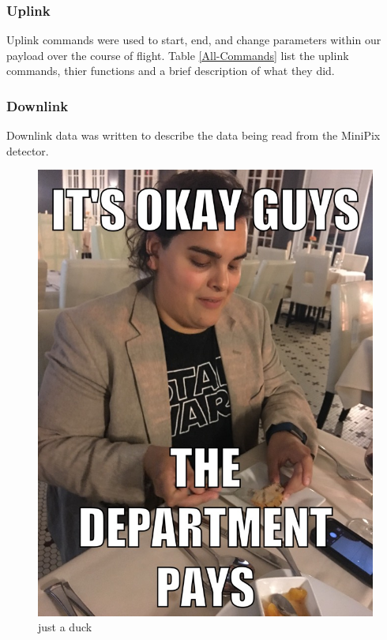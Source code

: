 \subsubsection{Uplink}
\label{sec:Uplink} 
Uplink commands were used to start, end, and change parameters within our payload over the course of flight. 
Table \ref{All-Commands} list the uplink commands, thier functions and a brief description of what they did. 

\subsubsection{Downlink}
\label{sec:Downlink}
Downlink data was written to describe the data being read from the MiniPix detector. 

\begin{figure}[h!]
  \begin{center}
      \includegraphics[width=\textwidth]{./figures/sam_meme.jpg}
      \caption{just a duck}
      \label{fig:duck}
  \end{center}
\end{figure}

